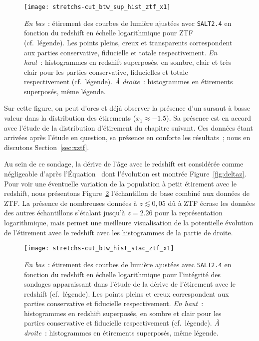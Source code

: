 \documentclass[../main/main.tex]{subfiles}
\begin{document}
\begin{figure}[ht!]
    \centering
    \texttt{[image: stretchs-cut\_btw\_sup\_hist\_ztf\_x1]}
    \caption[Présentation des données d'étirement en fonction du redshift pour
    ZTF]{\textit{En bas}~: étirement des courbes de lumière ajustées avec
        \textsc{\texttt{SALT2.4}} en fonction du redshift en échelle
        logarithmique pour ZTF (cf.~légende). Les points pleins, creux et
        transparents correspondent aux parties conservative, fiducielle et
        totale respectivement. \textit{En haut}~: histogrammes en redshift
        superposés, en sombre, clair et très clair pour les parties
        conservative, fiducielles et totale respectivement (cf.\ légende).
        \textit{À droite}~: histogrammes en étirements superposés, même
    légende.}\label{fig:ztfsample}
\end{figure}

Sur cette figure, on peut d'ores et déjà observer la présence d'un sursaut à
basse valeur dans la distribution des étirements ($x_1 \approx -1.5$). Sa
présence est en accord avec l'étude de la distribution d'étirement du chapitre
suivant. Ces données étant arrivées après l'étude en question, sa présence en
conforte les résultats~; nous en discutons Section~\ref{sec:xztf}.

Au sein de ce sondage, la dérive de l'âge avec le redshift est considérée comme
négligeable d'après l'Équation~ dont l'évolution est montrée
Figure~\ref{fig:deltaz}. Pour voir une éventuelle variation de la population à
petit étirement avec le redshift, nous présentons Figure~\ref{fig:zsample}
l'échantillon de base combiné aux données de ZTF. La présence de nombreuses
données à $z \lesssim 0,05$ dû à ZTF écrase les données des autres échantillons
s'étalant jusqu'à $z = 2.26$ pour la représentation logarithmique, mais permet
une meilleure visualisation de la potentielle évolution de l'étirement avec le
redshift avec les histogrammes de la partie de droite.

\vfill
\begin{figure}[ht!]
    \centering
    \texttt{[image: stretchs-cut\_btw\_hist\_stac\_ztf\_x1]}
    \caption[Présentation des données d'étirement en fonction du redshift pour
    l'échantillon de base combiné aux données de ZTF]{\textit{En bas}~:
        étirement des courbes de lumière ajustées avec \textsc{\texttt{SALT2.4}}
        en fonction du redshift en échelle logarithmique pour l'intégrité des
        sondages apparaissant dans l'étude de la dérive de l'étirement avec le
        redshift (cf.~légende). Les points pleins et creux  correspondent aux
        parties conservative et fiducielle  respectivement. \textit{En haut}~:
        histogrammes en redshift superposés, en sombre et clair pour les parties
        conservative et fiducielle respectivement (cf.\ légende). \textit{À
        droite}~: histogrammes en étirements superposés, même
    légende.}\label{fig:zsample}
\end{figure}
\vfill

\newpage

\thispagestyle{plain}
\vspace*{-3cm}
\vfill
\minilof
\vfill
\minilot
\vfill

% 
% 
\end{document}
